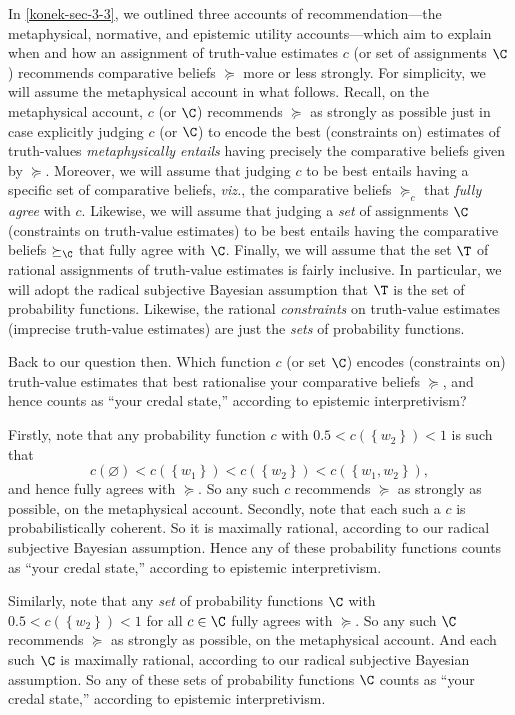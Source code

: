 In \autoref{konek-sec-3-3}, we outlined three accounts of recommendation---the metaphysical, normative, and epistemic utility accounts---which aim to explain when and how an assignment of truth-value estimates $c$ (or set of assignments $\C$) recommends comparative beliefs $\succeq$ more or less strongly. For simplicity, we will assume the metaphysical account in what follows. Recall, on the metaphysical account, $c$ (or $\C$) recommends $\succeq$ as strongly as possible just in case explicitly judging $c$ (or $\C$) to encode the best (constraints on) estimates of truth-values \textit{metaphysically entails} having precisely the comparative beliefs given by $\succeq$. Moreover, we will assume that judging $c$ to be best entails having a specific set of comparative beliefs, \textit{viz.}, the comparative beliefs $\succeq_c$ that \textit{fully agree} with $c$. Likewise, we will assume that judging a \textit{set} of assignments $\C$ (constraints on truth-value estimates) to be best entails having the comparative beliefs $\succeq_\C$ that fully agree with $\C$. Finally, we will assume that the set $\T$ of rational assignments of truth-value estimates is fairly inclusive. In particular, we will adopt the radical subjective Bayesian assumption that $\T$ is the set of probability functions. Likewise, the rational \textit{constraints} on truth-value estimates (imprecise truth-value estimates) are just the \textit{sets} of probability functions.

Back to our question then. Which function $c$ (or set $\C$) encodes (constraints on) truth-value estimates that best rationalise your comparative beliefs $\succeq$, and hence counts as ``your credal state,'' according to epistemic interpretivism? 


Firstly, note that any probability function $c$ with $0.5<c(\left\{w_2\right\})<1$ is such that 
$$ c(\varnothing)<c(\left\{w_1\right\})<c(\left\{w_2\right\})<c(\left\{w_1,w_2\right\}), $$
and hence fully agrees with $\succeq$. So any such $c$ recommends $\succeq$ as strongly as possible, on the metaphysical account. Secondly, note that each such a $c$ is probabilistically coherent. So it is maximally rational, according to our radical subjective Bayesian assumption. Hence any of these probability functions counts as ``your credal state,'' according to epistemic interpretivism.

Similarly, note that any \textit{set} of probability functions $\C$ with $0.5<c(\left\{w_2\right\})<1$ for all $c\in\C$ fully agrees with $\succeq$. So any such $\C$ recommends $\succeq$ as strongly as possible, on the metaphysical account. And each such $\C$ is maximally rational, according to our radical subjective Bayesian assumption. So any of these sets of probability functions $\C$ counts as ``your credal state,'' according to epistemic interpretivism.

